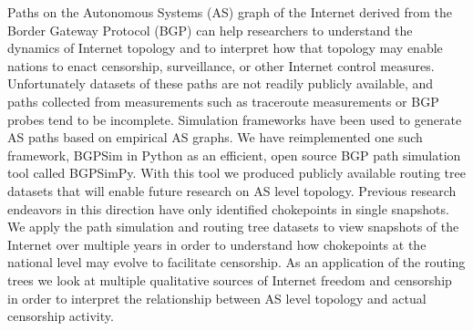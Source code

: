 \documentclass{article}
\begin{document}
Paths on the Autonomous Systems (AS) graph of the Internet derived from the Border Gateway Protocol (BGP) can help researchers to understand the dynamics of Internet topology and to interpret how that topology may enable nations to enact censorship, surveillance, or other Internet control measures. Unfortunately datasets of these paths are not readily publicly available, and paths collected from measurements such as traceroute measurements or BGP probes tend to be incomplete. Simulation frameworks have been used to generate AS paths based on empirical AS graphs. We have reimplemented one such framework, BGPSim \cite{quicksand} in Python as an efficient, open source BGP path simulation tool called BGPSimPy. With this tool we produced publicly available routing tree datasets that will enable future research on AS level topology. Previous research endeavors in this direction have only identified chokepoints in single snapshots. We apply the path simulation and routing tree datasets to view snapshots of the Internet over multiple years in order to understand how chokepoints at the national level may evolve to facilitate censorship. As an application of the routing trees we look at multiple qualitative sources of Internet freedom and censorship in order to interpret the relationship between AS level topology and actual censorship activity.




\end{document}
